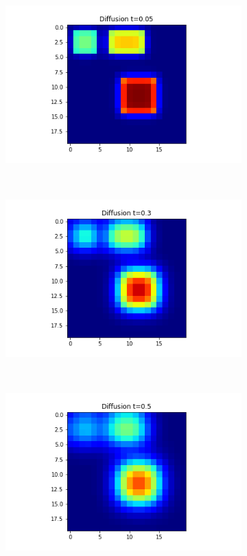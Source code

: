 \documentclass[10pt,a4paper]{article}
\begin{document}
\begin{figure}[!h]
\begin{subfigure}[b]{0.25\textwidth}
    		\includegraphics[width= \textwidth]{images/laplace-x3-t05.png}
    		\caption{}
    		\label{laplacet05}
    	\end{subfigure}~
    	\begin{subfigure}[b]{0.25\textwidth}
    		\includegraphics[width= \textwidth]{images/laplace-x3-t3.png}
    		\caption{}
    		\label{laplacet3}
    	\end{subfigure}~
    	\begin{subfigure}[b]{0.25\textwidth}
    		\includegraphics[width= \textwidth]{images/laplace-x3-t5.png}

\end{subfigure}
\end{figure}
\end{document}
